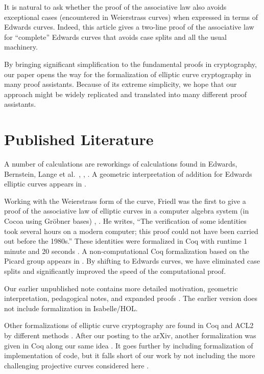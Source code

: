 \documentclass{llncs}
\begin{document}
It is natural to ask whether the proof of the associative law also
avoids exceptional cases (encountered in Weierstrass curves)
when expressed in terms of Edwards curves.
Indeed, this article gives a two-line proof of the associative law for
``complete'' Edwards curves that avoids case splits and all
the usual machinery.

By bringing significant simplification to the fundamental proofs in
cryptography, our paper opens the way for the formalization of
elliptic curve cryptography in many proof assistants.  Because of its
extreme simplicity, we hope that our approach might be widely replicated
and translated into many different proof assistants.

\section{Published Literature}

A number of calculations are reworkings of calculations found in
Edwards, Bernstein, Lange et al.~\cite{edwards2007normal},
\cite{bernstein2008twisted}, \cite{bernstein2007faster}.  A geometric
interpretation of addition for Edwards elliptic curves appears in
\cite{arene2011faster}.

Working with the Weierstrass form of the curve, Friedl was the first
to give a proof of the associative law of elliptic curves in a
computer algebra system (in Cocoa using Gr\"obner bases)
\cite{friedl}, \cite{friedl2017elementary}.  He writes, ``The
verification of some identities took several hours on a modern
computer; this proof could not have been carried out before the
1980s.''  These identities were formalized in Coq with runtime 1
minute and 20 seconds \cite{thery2007proving}.  A non-computational
Coq formalization based on the Picard group appears in
\cite{bartzia2014formal}.  By shifting to Edwards curves, we have
eliminated case splits and significantly improved the speed of the
computational proof.

Our earlier unpublished note contains more detailed motivation,
geometric interpretation, pedagogical notes, and expanded proofs
\cite{hales2016group}.  The earlier version does not include
formalization in Isabelle/HOL.

Other formalizations of elliptic curve cryptography are found in Coq
and ACL2 by different methods \cite{russinoff2017computationally}.
After our posting to the arXiv, another formalization was given in Coq
along our same idea \cite{erbsen2017crafting}.  It goes further by including
formalization of implementation of code, 
but it falls short of our work by not including the more
challenging projective curves considered here
\cite{erbsen2017systematic}.
\end{document}
